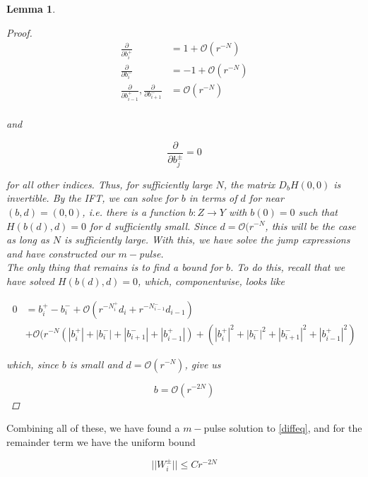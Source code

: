 \documentclass[12pt]{article}
\newtheorem{lemma}{Lemma}
\begin{document}
\begin{lemma}
\begin{proof}
\begin{align*}
\frac{\partial}{\partial b_i^+} &= 1 + \mathcal{O}(r^{-N})  \\
\frac{\partial}{\partial b_i^-} &= -1 + \mathcal{O}(r^{-N}) \\
\frac{\partial}{\partial b_{i-1}^+},
\frac{\partial}{\partial b_{i+1}^-} &= \mathcal{O}(r^{-N}) \\
\end{align*}

and 

\[
\frac{\partial}{\partial b_j^\pm} = 0
\]

for all other indices. Thus, for sufficiently large $N$, the matrix $D_b H(0,0)$ is invertible. By the IFT, we can solve for $b$ in terms of $d$ for near $(b,d) = (0, 0)$, i.e. there is a function $b: Z \rightarrow Y$ with $b(0) = 0$ such that $H(b(d),d) = 0$ for $d$ sufficiently small. Since $d = \mathcal{O}(r^{-N}$, this will be the case as long as $N$ is sufficiently large. With this, we have solve the jump expressions and have constructed our $m-$pulse.\\

The only thing that remains is to find a bound for $b$. To do this, recall that we have solved $H(b(d),d) = 0$, which, componentwise, looks like

\begin{align*}
0 &= b_i^+ - b_i^- + \mathcal{O}(r^{-N_i^+} d_i + r^{-N_{i-1}^-} d_{i-1}) \\
&+ \mathcal{O}( r^{-N}(|b_i^+| + |b_i^-| + |b_{i+1}^-| + |b_{i-1}^+|)
+ (|b_i^+|^2 + |b_i^-|^2 + |b_{i+1}^-|^2 + |b_{i-1}^+|^2)
\end{align*}

which, since $b$ is small and $d = \mathcal{O}(r^{-N})$, give us

\[
b = \mathcal{O}(r^{-2N})
\]

\end{proof}
\end{lemma}

Combining all of these, we have found a $m-$pulse solution to \eqref{diffeq}, and for the remainder term we have the uniform bound

\[
||W_i^\pm|| \leq C r^{-2N}
\]
\end{document}
